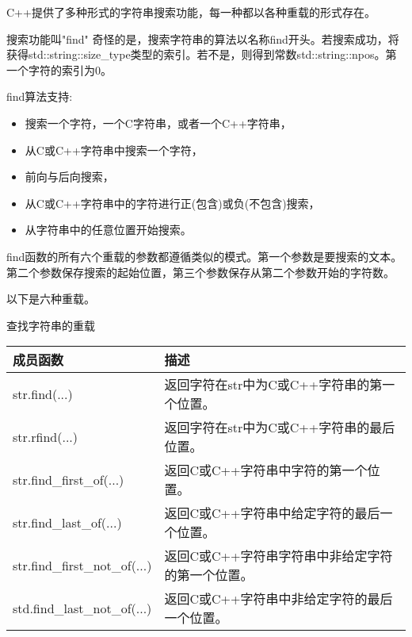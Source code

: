 
C++提供了多种形式的字符串搜索功能，每一种都以各种重载的形式存在。

\begin{myTip}{搜索功能叫"find"}
奇怪的是，搜索字符串的算法以名称find开头。若搜索成功，将获得std::string::size\_type类型的索引。若不是，则得到常数std::string::npos。第一个字符的索引为0。
\end{myTip}

find算法支持:

\begin{itemize}
\item 
搜索一个字符，一个C字符串，或者一个C++字符串，

\item 
从C或C++字符串中搜索一个字符，

\item 
前向与后向搜索，

\item 
从C或C++字符串中的字符进行正(包含)或负(不包含)搜索，

\item 
从字符串中的任意位置开始搜索。
\end{itemize}

find函数的所有六个重载的参数都遵循类似的模式。第一个参数是要搜索的文本。第二个参数保存搜索的起始位置，第三个参数保存从第二个参数开始的字符数。

以下是六种重载。

\begin{center}
查找字符串的重载
\end{center}

\begin{longtable}[c]{|l|l|}
\hline
\textbf{成员函数} & \textbf{描述}                                                      \\ \hline
\endfirsthead
%
\endhead
%
str.find(...)             & 返回字符在str中为C或C++字符串的第一个位置。      \\ \hline
str.rfind(...)            & 返回字符在str中为C或C++字符串的最后位置。       \\ \hline
str.find\_first\_of(...)  & 返回C或C++字符串中字符的第一个位置。 \\ \hline
str.find\_last\_of(...)   & 返回C或C++字符串中给定字符的最后一个位置。   \\ \hline
str.find\_first\_not\_of(...) & 返回C或C++字符串字符串中非给定字符的第一个位置。 \\ \hline
std.find\_last\_not\_of(...)  & 返回C或C++字符串中非给定字符的最后一个位置。  \\ \hline
\end{longtable}

